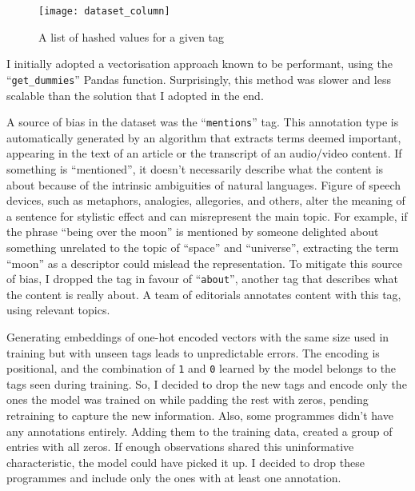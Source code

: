 \begin{figure}[h]
  \centering
  \texttt{[image: dataset\_column]}
  \caption{A list of hashed values for a given tag}
  \label{fig:dataset_column}
\end{figure}

I initially adopted a vectorisation approach known to be performant, using the ``\verb|get_dummies|'' Pandas function.
Surprisingly, this method was slower and less scalable than the solution that I adopted in the end.

A source of bias in the dataset was the ``\verb|mentions|'' tag. This annotation type is automatically generated by an algorithm that extracts
terms deemed important, appearing in the text of an article or the transcript of an audio/video content.
If something is ``mentioned'', it doesn't necessarily describe what the content is about because of the intrinsic ambiguities of natural languages.
Figure of speech devices, such as metaphors, analogies, allegories, and others, alter the meaning of a sentence for stylistic effect and can misrepresent the main topic.
For example, if the phrase ``being over the moon'' is mentioned
by someone delighted about something unrelated to the topic of ``space'' and ``universe'',
extracting the term ``moon'' as a descriptor could mislead the representation.
To mitigate this source of bias, I dropped the tag in favour of ``\verb|about|'', another tag that describes what the content is really about.
A team of editorials annotates content with this tag, using relevant topics.

Generating embeddings of one-hot encoded vectors with the same size used in training but with
unseen tags leads to unpredictable errors.
The encoding is positional, and the combination of \verb|1| and \verb|0| learned by the model
belongs to the tags seen during training. So, I decided to drop the new tags and encode only the ones the model was trained on
while padding the rest with zeros, pending retraining to capture the new information.
Also, some programmes didn't have any annotations entirely. Adding them to the training data, created a group of entries with all zeros.
If enough observations shared this uninformative characteristic, the model could have picked it up.
I decided to drop these programmes and include only the ones with at least one annotation.
